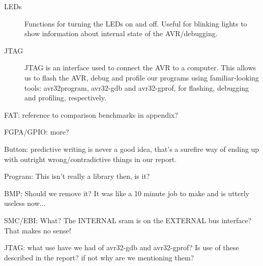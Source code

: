 \begin{description}
\item[LEDs] Functions for turning the \acp{LED} on and off. Useful for blinking
  lights to show information about internal state of the AVR/debugging.
  
\item[JTAG] \ac{JTAG} is an interface used to connect the AVR to a
  computer. This allows us to flash the AVR, debug and profile our programs
  using familiar-looking tools: avr32program, avr32-gdb and avr32-gprof, for
  flashing, debugging and profiling, respectively.
\end{description}

{\color{red}

FAT: reference to comparison benchmarks in appendix?

FGPA/GPIO: more?

Button: predictive writing is never a good idea, that's a surefire way of ending
up with outright wrong/contradictive things in our report.

Program: This isn't really a library then, is it?

BMP: Should we remove it? It was like a 10 minute job to make and is utterly
useless now...

SMC/EBI: What? The INTERNAL sram is on the EXTERNAL bus interface? That makes no
sense!

JTAG: what use have we had of avr32-gdb and avr32-gprof? Is use of these
described in the report? if not why are we mentioning them?
}
